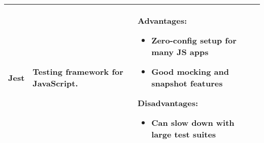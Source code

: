 \documentclass{article}
\begin{document}
\begin{table}[htbp]
\begin{tabularx}{\textwidth}{p{2cm} p{4cm} X}
  \textbf{Jest} 
  & Testing framework for JavaScript.
  & \textbf{Advantages:}
    \begin{itemize}
      \item Zero-config setup for many JS apps
      \item Good mocking and snapshot features
    \end{itemize}
    \textbf{Disadvantages:}
    \begin{itemize}
      \item Can slow down with large test suites
    \end{itemize}
  \\
  \bottomrule
  \end{tabularx}
\end{table}


\end{document}
